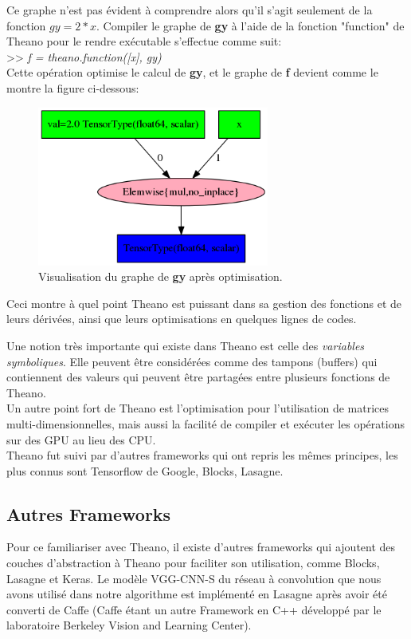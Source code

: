 	Ce graphe n'est pas évident à comprendre alors qu'il s'agit seulement de la fonction $ gy = 2*x$. Compiler le graphe de \textbf{gy} à l'aide de la fonction "function" de Theano pour le rendre exécutable s'effectue comme suit:\\

>> \textit{f = theano.function([x], gy)}\\

	Cette opération optimise le calcul de \textbf{gy}, et le graphe de \textbf{f} devient comme le montre la figure ci-dessous:

\begin{figure}[H]
	\centering
		\includegraphics[width=3in]{Figures/afterOptimization.png}
	\caption[TheanoGraph]{Visualisation du graphe de \textbf{gy} après optimisation.}
	\label{fig:Electron}
\end{figure}

	Ceci montre à quel point Theano est puissant dans sa gestion des fonctions et de leurs dérivées, ainsi que leurs optimisations en quelques lignes de codes.
	
	Une notion très importante qui existe dans Theano est celle des \textit{variables symboliques}. Elle peuvent être considérées comme des tampons (buffers) qui contiennent des valeurs qui peuvent être partagées entre plusieurs fonctions de Theano.\\

	Un autre point fort de Theano est l'optimisation pour l'utilisation de matrices multi-dimensionnelles, mais aussi la facilité de compiler et exécuter les opérations sur des GPU au lieu des CPU.\\

	Theano fut suivi par d'autres frameworks qui ont repris les mêmes principes, les plus connus sont Tensorflow de Google, Blocks, Lasagne.

\subsection{Autres Frameworks}
	Pour ce familiariser avec Theano, il existe d'autres frameworks qui ajoutent des couches d'abstraction à Theano pour faciliter son utilisation, comme Blocks, Lasagne et Keras.
	Le modèle VGG-CNN-S du réseau à convolution que nous avons utilisé dans notre algorithme est implémenté en Lasagne après avoir été converti de Caffe (Caffe étant un autre Framework en C++ développé par le laboratoire Berkeley Vision and Learning Center).\\


